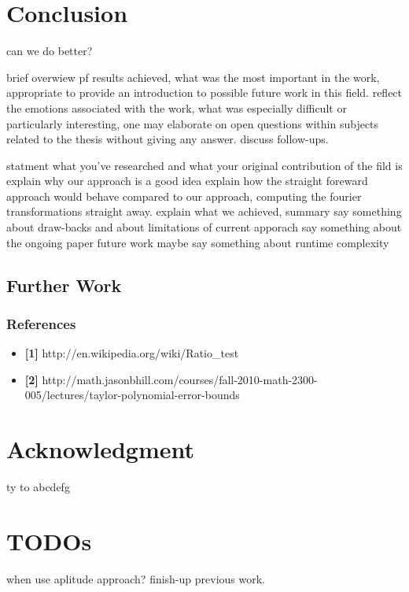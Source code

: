 \section{Conclusion}

can we do better?

brief overwiew pf results achieved, what was the most important in the work, appropriate to provide an introduction to possible future work in this field. reflect the emotions associated with the work, what was especially difficult or particularly interesting, one may elaborate on open questions within subjects related to the thesis without giving any answer. discuss follow-ups.

statment what you've researched and what your original contribution of the fild is
explain why our approach is a good idea
explain how the straight foreward approach would behave compared to our approach, computing the fourier transformations straight away.
explain what we achieved, summary
say something about draw-backs and about limitations of current apporach
say something about the ongoing paper future work
maybe say something about runtime complexity

\subsection{Further Work}
\subsubsection{References}
\begin{itemize}
\item \textbf{{[}1{]}} http://en.wikipedia.org/wiki/Ratio\_test
\item \textbf{{[}2{]}} http://math.jasonbhill.com/courses/fall-2010-math-2300-005/lectures/taylor-polynomial-error-bounds\end{itemize}
\section{Acknowledgment}
ty to abcdefg
\section{TODOs}

when use aplitude approach?
finish-up previous work.

